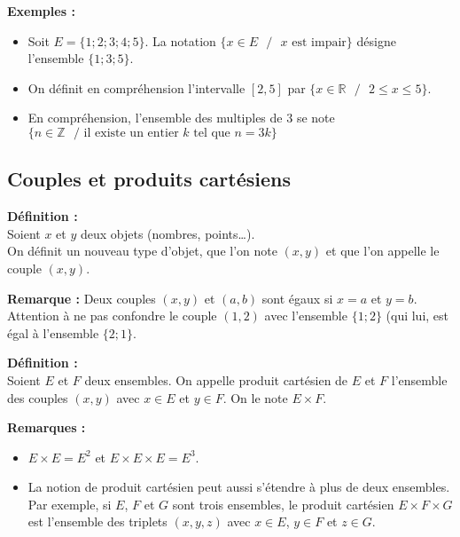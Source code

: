 \documentclass{article}
\begin{document}
\textbf{Exemples :}
\begin{itemize}
  \item Soit $E=\{1; 2; 3; 4; 5\}$. La notation $\{x\in E \text{ }/\text{ } x \text{ est impair}\}$ désigne l'ensemble $\{1; 3; 5\}$.
  \item On définit en compréhension l'intervalle $[2, 5]$ par $\{ x\in\mathbb{R} \text{ }/\text{ } 2 \leq x \leq 5 \}$.
  \item En compréhension, l'ensemble des multiples de $3$ se note $\{ n\in\mathbb{Z} \text{ }/\text{ il existe un entier $k$ tel que } n=3k\}$
\end{itemize}

\subsection{Couples et produits cartésiens}

\begin{mdframed}[style=definitionStyle]
    \textbf{Définition :} ~\\
    Soient $x$ et $y$ deux objets (nombres, points\dots).\\
    On définit un nouveau type d'objet, que l'on note $(x,y)$ et que l'on appelle le couple $(x,y)$.
\end{mdframed}

\textbf{Remarque :} Deux couples $(x,y)$ et $(a,b)$ sont égaux si $x=a$ et $y=b$. Attention à ne pas confondre le couple
$(1,2)$ avec l'ensemble $\{1;2\}$ (qui lui, est égal à l'ensemble $\{ 2;1 \}$.

\begin{mdframed}[style=definitionStyle]
    \textbf{Définition :} ~\\
    Soient $E$ et $F$ deux ensembles. On appelle produit cartésien de $E$ et $F$ l'ensemble des couples $(x,y)$ avec
    $x\in E$ et $y\in F$. On le note $E\times F$.
\end{mdframed}

\textbf{Remarques :}
\begin{itemize}
  \item $E\times E = E^2$ et $E\times E\times E = E^3$.
  \item La notion de produit cartésien peut aussi s'étendre à plus de deux ensembles. Par exemple, si $E$, $F$ et $G$
  sont trois ensembles, le produit cartésien $E\times F\times G$ est l'ensemble des triplets $(x, y, z)$ avec $x\in E$,
  $y\in F$ et $z\in G$.
\end{itemize}
\end{document}
